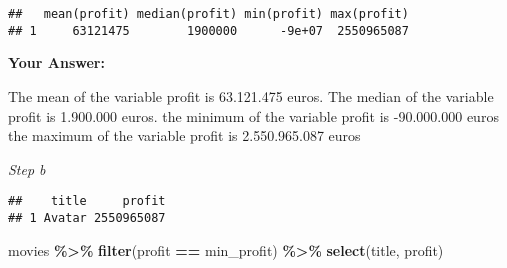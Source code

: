 \documentclass[
]{article}
\newenvironment{Shaded}{\begin{snugshade}}{\end{snugshade}}
\newcommand{\CommentTok}[1]{\textcolor[rgb]{0.56,0.35,0.01}{\textit{#1}}}
\newcommand{\FunctionTok}[1]{\textcolor[rgb]{0.13,0.29,0.53}{\textbf{#1}}}
\newcommand{\NormalTok}[1]{#1}
\newcommand{\OtherTok}[1]{\textcolor[rgb]{0.56,0.35,0.01}{#1}}
\newcommand{\SpecialCharTok}[1]{\textcolor[rgb]{0.81,0.36,0.00}{\textbf{#1}}}
\begin{document}
\begin{Shaded}
\end{Shaded}

\begin{verbatim}
##   mean(profit) median(profit) min(profit) max(profit)
## 1     63121475        1900000      -9e+07  2550965087
\end{verbatim}

\textbf{Your Answer:}

The mean of the variable profit is 63.121.475 euros. The median of the
variable profit is 1.900.000 euros. the minimum of the variable profit
is -90.000.000 euros the maximum of the variable profit is 2.550.965.087
euros

\emph{Step b}

\begin{Shaded}
\end{Shaded}

\begin{verbatim}
##    title     profit
## 1 Avatar 2550965087
\end{verbatim}

\begin{Shaded}
\begin{Highlighting}[]
\NormalTok{movies }\SpecialCharTok{\%\textgreater{}\%}
  \FunctionTok{filter}\NormalTok{(profit }\SpecialCharTok{==}\NormalTok{ min\_profit) }\SpecialCharTok{\%\textgreater{}\%}
  \FunctionTok{select}\NormalTok{(title, profit)}
\end{Highlighting}
\end{Shaded}
\end{document}
